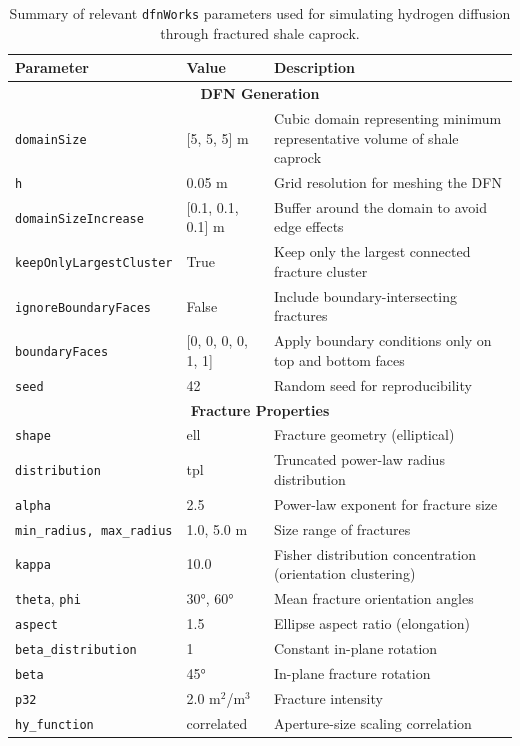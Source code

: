 \documentclass{article}
\begin{document}
\begin{table}[!htbp]
\centering
\small
\caption{Summary of relevant \texttt{dfnWorks} parameters used for simulating hydrogen diffusion through fractured shale caprock.}
\begin{tabular}{|p{4cm}|p{4cm}|p{6.5cm}|}
\hline
\textbf{Parameter} & \textbf{Value} & \textbf{Description} \\
\hline
\multicolumn{3}{|c|}{\textbf{DFN Generation}} \\
\hline
\texttt{domainSize} & [5, 5, 5] m & Cubic domain representing minimum representative volume of shale caprock \\
\texttt{h} & 0.05 m & Grid resolution for meshing the DFN \\
\texttt{domainSizeIncrease} & [0.1, 0.1, 0.1] m & Buffer around the domain to avoid edge effects \\
\texttt{keepOnlyLargestCluster} & True & Keep only the largest connected fracture cluster \\
\texttt{ignoreBoundaryFaces} & False & Include boundary-intersecting fractures \\
\texttt{boundaryFaces} & [0, 0, 0, 0, 1, 1] & Apply boundary conditions only on top and bottom faces \\
\texttt{seed} & 42 & Random seed for reproducibility \\
\hline
\multicolumn{3}{|c|}{\textbf{Fracture Properties}} \\
\hline
\texttt{shape} & ell & Fracture geometry (elliptical) \\
\texttt{distribution} & tpl & Truncated power-law radius distribution \\
\texttt{alpha} & 2.5 & Power-law exponent for fracture size \\
\texttt{min\_radius, max\_radius} & 1.0, 5.0 m & Size range of fractures \\
\texttt{kappa} & 10.0 & Fisher distribution concentration (orientation clustering) \\
\texttt{theta}, \texttt{phi} & 30°, 60° & Mean fracture orientation angles \\
\texttt{aspect} & 1.5 & Ellipse aspect ratio (elongation) \\
\texttt{beta\_distribution} & 1 & Constant in-plane rotation \\
\texttt{beta} & 45° & In-plane fracture rotation \\
\texttt{p32} & 2.0 m$^2$/m$^3$ & Fracture intensity \\
\texttt{hy\_function} & correlated & Aperture-size scaling correlation \\

\end{tabular}
\end{table}
\end{document}
